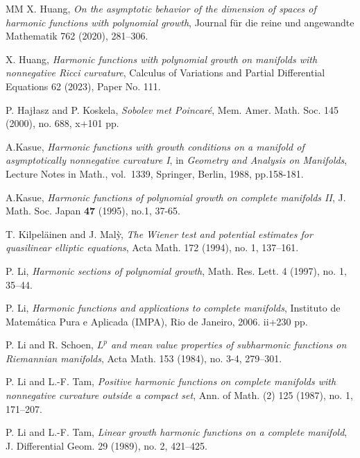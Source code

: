 \documentclass[12pt]{amsart}
\theoremstyle{plain}
\theoremstyle{definition}
\theoremstyle{remark}     %
\numberwithin{equation}{section}
\begin{document}
\begin{thebibliography}{MM}
 X. Huang, \emph{On the asymptotic behavior of the dimension of spaces of harmonic functions with polynomial growth}, Journal für die reine und angewandte Mathematik 762 (2020), 281–306.

 X. Huang, \emph{Harmonic functions with polynomial growth on manifolds with nonnegative Ricci curvature}, Calculus of Variations and Partial Differential Equations 62 (2023), Paper No. 111.

P. Hajłasz and P. Koskela,
\emph{Sobolev met Poincar\'e},
Mem. Amer. Math. Soc. 145 (2000), no. 688, x+101 pp.

 A.Kasue,
\emph{Harmonic functions with growth conditions on a manifold of asymptotically nonnegative curvature I},
in \emph{Geometry and Analysis on Manifolds}, Lecture Notes in Math., vol.~1339,
Springer, Berlin, 1988, pp.158-181.


A.Kasue,
\emph{Harmonic functions of polynomial growth on complete manifolds II},
J. Math. Soc. Japan \textbf{47} (1995), no.1, 37-65.



T. Kilpel{\"a}inen and J. Mal{\`y}, 
\emph{The Wiener test and potential estimates for quasilinear elliptic equations},
Acta Math. 172 (1994), no. 1, 137–161.


 P. Li, \emph{Harmonic sections of polynomial growth},
Math. Res. Lett. 4 (1997), no. 1, 35–44.

P. Li,
\emph{Harmonic functions and applications to complete manifolds},
Instituto de Matemática Pura e Aplicada (IMPA), Rio de Janeiro, 2006. ii+230 pp.

P. Li and R. Schoen,
\emph{$L^p$  and mean value properties of subharmonic functions on Riemannian manifolds},
Acta Math. 153 (1984), no. 3-4, 279–301.


 P. Li and L.-F. Tam,
\emph{Positive harmonic functions on complete manifolds with nonnegative curvature outside a compact set},
Ann. of Math. (2) 125 (1987), no. 1, 171–207.


 P. Li and L.-F. Tam, \emph{Linear growth harmonic functions on a complete manifold},
J. Differential Geom. 29 (1989), no. 2, 421–425.


\end{thebibliography}
\end{document}
